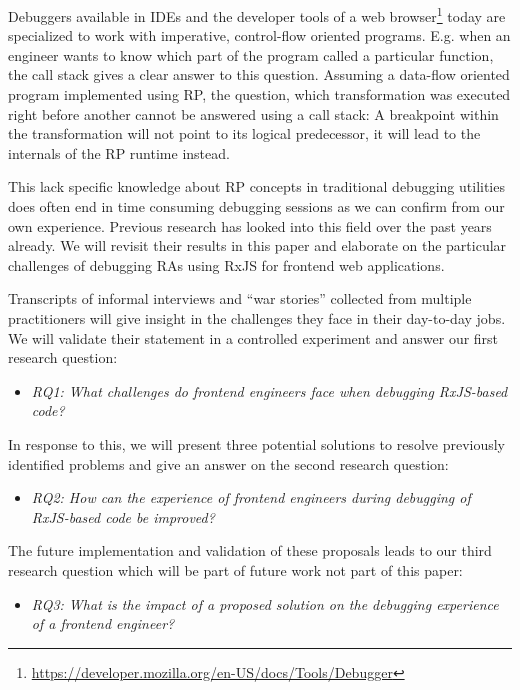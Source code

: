 \documentclass[12pt,a4paper]{article}
\begin{document}
Debuggers available in IDEs and the developer tools of a web browser\footnote{\url{https://developer.mozilla.org/en-US/docs/Tools/Debugger}} today are specialized to work with imperative, control-flow oriented programs. E.g. when an engineer wants to know which part of the program called a particular function, the call stack gives a clear answer to this question. Assuming a data-flow oriented program implemented using RP, the question, which transformation was executed right before another cannot be answered using a call stack: A breakpoint within the transformation will not point to its logical predecessor, it will lead to the internals of the RP runtime instead.

This lack specific knowledge about RP concepts in traditional debugging utilities does often end in time consuming debugging sessions as we can confirm from our own experience. Previous research has looked into this field \cite{10.1145/2577080.2577083} \cite{10.1145/2884781.2884815} \cite{10.1145/3180155.3180156} over the past years already. We will revisit their results in this paper and elaborate on the particular challenges of debugging RAs using RxJS for frontend web applications.

Transcripts of informal interviews and ``war stories'' collected from multiple practitioners will give insight in the challenges they face in their day-to-day jobs. We will validate their statement in a controlled experiment and answer our first research question:

\begin{itemize}
	\item \emph{RQ1: What challenges do frontend engineers face when debugging RxJS-based code?}
\end{itemize}

In response to this, we will present three potential solutions to resolve previously identified problems and give an answer on the second research question:

\begin{itemize}
	\item \emph{RQ2: How can the experience of frontend engineers during debugging of RxJS-based code be improved?}
\end{itemize}

The future implementation and validation of these proposals leads to our third research question which will be part of future work not part of this paper:

\begin{itemize}
	\item \emph{RQ3: What is the impact of a proposed solution on the debugging experience of a frontend engineer?}
\end{itemize}
\end{document}
